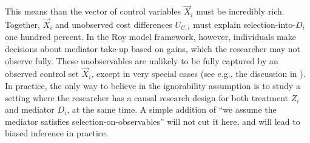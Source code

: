 This means than the vector of control variables $\vec X_i$ must be incredibly rich.
Together, $\vec X_i$ and unobserved cost differences $U_{C,i}$ must explain selection-into-$D_i$ one hundred percent.
In the Roy model framework, however, individuals make decisions about mediator take-up based on gains, which the researcher may not observe fully. 
These unobservables are unlikely to be fully captured by an observed control set $\vec X_i$, except in very special cases (see e.g., the discussion in \citealt{angrist2009mostly,angrist2022empirical}).
In practice, the only way to believe in the ignorability assumption is to study a setting where the researcher has a causal research design for both treatment $Z_i$ and mediator $D_i$, at the same time.
A simple addition of ``we assume the mediator satisfies selection-on-observables'' will not cut it here, and will lead to biased inference in practice.

% 
% 
% 
